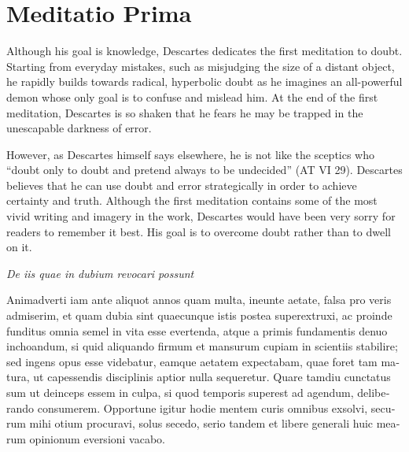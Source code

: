 \chapter{Meditatio Prima}


Although his goal is knowledge, Descartes dedicates the first meditation to doubt. Starting from everyday mistakes, such as misjudging the size of a distant object, he rapidly builds towards radical, hyperbolic doubt as he imagines an all-powerful demon whose only goal is to confuse and mislead him. At the end of the first meditation, Descartes is so shaken that he fears he may be trapped in the unescapable darkness of error.

However, as Descartes himself says elsewhere, he is not like the sceptics who ``doubt only to doubt and pretend always to be undecided'' (AT VI 29). Descartes believes that he can use doubt and error strategically in order to achieve certainty and truth. Although the first meditation contains some of the most vivid writing and imagery in the work, Descartes would have been very sorry for readers to remember it best. His goal is to overcome doubt rather than to dwell on it.

\clearpage
\begin{center}
    \beginnumbering
    \numberlinefalse
    \pstart
    \textit{De iis quae in dubium revocari possunt}
    \pend
    \endnumbering
\end{center}

\beginnumbering
\numberpstarttrue
\pstart
\begin{latin}
    Animadverti iam ante aliquot annos quam multa, ineunte aetate, falsa pro veris admiserim, et quam dubia sint quaecunque istis postea superextruxi, ac proinde funditus omnia semel in vita esse evertenda, atque a primis fundamentis denuo inchoandum, si quid aliquando firmum et mansurum cupiam in scientiis stabilire; sed ingens opus esse videbatur, eamque aetatem expectabam, quae foret tam matura, ut capessendis disciplinis aptior nulla sequeretur. Quare tamdiu cunctatus sum ut deinceps essem in culpa, si quod temporis superest ad agendum, deliberando consumerem. Opportune igitur hodie mentem curis omnibus exsolvi, securum mihi otium procuravi, solus secedo, serio tandem et libere generali huic mearum opinionum eversioni vacabo.
\end{latin}
\pend
\endnumbering

